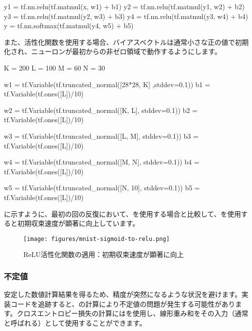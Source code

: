 \begin{content}
\begin{content}
\begin{leftbar}
\begin{python}
y1 = tf.nn.relu(tf.matmul(x,  w1) + b1)
y2 = tf.nn.relu(tf.matmul(y1, w2) + b2)
y3 = tf.nn.relu(tf.matmul(y2, w3) + b3)
y4 = tf.nn.relu(tf.matmul(y3, w4) + b4)
y  = tf.nn.softmax(tf.matmul(y4, w5) + b5)
\end{python}
\end{leftbar}

また、活性化関数を使用する場合、バイアスベクトルは通常小さな正の値で初期化され、ニューロンが最初からの非ゼロ領域で動作するようにします。

\begin{leftbar}
\begin{python}
K = 200
L = 100
M = 60
N = 30

w1 = tf.Variable(tf.truncated_normal([28*28, K] ,stddev=0.1)) 
b1 = tf.Variable(tf.ones([L])/10)

w2 = tf.Variable(tf.truncated_normal([K, L], stddev=0.1))
b2 = tf.Variable(tf.ones([L])/10)

w3 = tf.Variable(tf.truncated_normal([L, M], stddev=0.1)) 
b3 = tf.Variable(tf.ones([L])/10)

w4 = tf.Variable(tf.truncated_normal([M, N], stddev=0.1)) 
b4 = tf.Variable(tf.ones([L])/10)

w5 = tf.Variable(tf.truncated_normal([N, 10], stddev=0.1)) 
b5 = tf.Variable(tf.ones([L])/10)
\end{python}
\end{leftbar}

に示すように、最初の回の反復において、を使用する場合と比較して、を使用すると初期収束速度が顕著に向上しています。

\begin{figure}[H]
\centering
\texttt{[image: figures/mnist-sigmoid-to-relu.png]}
\caption{ReLU活性化関数の適用：初期収束速度が顕著に向上}
 \label{fig:mnist-sigmoid-to-relu}
\end{figure}

\subsubsection{不定値}

安定した数値計算結果を得るため、精度が突然になるような状況を避けます。実装コードを追跡すると、の計算により不定値の問題が発生する可能性があります。クロスエントロピー損失の計算にはを使用し、線形重み和をその入力（通常と呼ばれる）として使用することができます。


\end{content}
\end{content}
